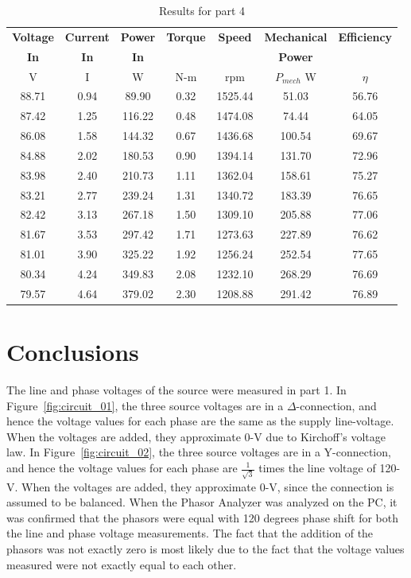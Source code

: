 \documentclass{article}
\begin{document}
\begin{table}[H]
  \centering
  \begin{tabular}{*{7}{c}}

    \textbf{Voltage} & \textbf{Current} & \textbf{Power} & \textbf{Torque} &
    \textbf{Speed} & \textbf{Mechanical} & \textbf{Efficiency} \\

    \textbf{In} & \textbf{In} & \textbf{In} & & & \textbf{Power} & \\

    V & I & W & N-m & rpm & $P_{mech}$ W & $\eta$ \\
    \hline

    88.71 & 0.94 &  89.90 & 0.32 & 1525.44 &  51.03 & 56.76 \\
    87.42 & 1.25 & 116.22 & 0.48 & 1474.08 &  74.44 & 64.05 \\
    86.08 & 1.58 & 144.32 & 0.67 & 1436.68 & 100.54 & 69.67 \\
    84.88 & 2.02 & 180.53 & 0.90 & 1394.14 & 131.70 & 72.96 \\
    83.98 & 2.40 & 210.73 & 1.11 & 1362.04 & 158.61 & 75.27 \\
    83.21 & 2.77 & 239.24 & 1.31 & 1340.72 & 183.39 & 76.65 \\
    82.42 & 3.13 & 267.18 & 1.50 & 1309.10 & 205.88 & 77.06 \\
    81.67 & 3.53 & 297.42 & 1.71 & 1273.63 & 227.89 & 76.62 \\
    81.01 & 3.90 & 325.22 & 1.92 & 1256.24 & 252.54 & 77.65 \\
    80.34 & 4.24 & 349.83 & 2.08 & 1232.10 & 268.29 & 76.69 \\
    79.57 & 4.64 & 379.02 & 2.30 & 1208.88 & 291.42 & 76.89 \\
  \end{tabular}
  \caption{Results for part 4}
  \label{}
\end{table}

\section{Conclusions}

The line and phase voltages of the source were measured in part 1. In
Figure~\ref{fig:circuit_01}, the three source voltages are in a
$\Delta$-connection, and hence the voltage values for each phase are the same
as the supply line-voltage.  When the voltages are added, they approximate 0-V
due to Kirchoff's voltage law. In Figure~\ref{fig:circuit_02}, the three source
voltages are in a Y-connection, and hence the voltage values for each phase are
$\frac{1}{\sqrt{3}}$ times the line voltage of 120-V.  When the voltages are
added, they approximate 0-V, since the connection is assumed to be balanced.
When the Phasor Analyzer was analyzed on the {PC}, it was confirmed that the
phasors were equal with 120 degrees phase shift for both the line and phase
voltage measurements. The fact that the addition of the phasors was not exactly
zero is most likely due to the fact that the voltage values measured were not
exactly equal to each other.
\end{document}
